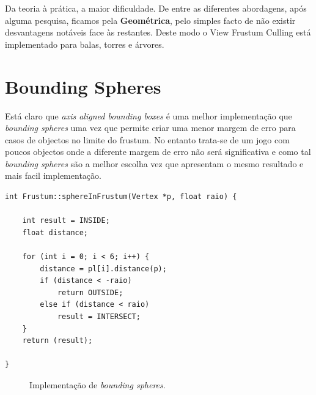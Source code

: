 Da teoria à prática, a maior dificuldade. De entre as diferentes abordagens, após alguma pesquisa, ficamos pela {\bf Geométrica}, pelo simples facto de não existir desvantagens notáveis face às restantes. Deste modo o View Frustum Culling está implementado para balas, torres e árvores.

\section{Bounding Spheres}
Está claro que \textit{axis aligned bounding boxes} é uma melhor implementação que \textit{bounding spheres} uma vez que permite criar uma menor margem de erro para casos de objectos no limite do frustum. No entanto trata-se de um jogo com poucos objectos onde a diferente margem de erro não será significativa e como tal \textit{bounding spheres} são a melhor escolha vez que apresentam o mesmo resultado e mais facil implementação.


\begin{lstlisting}[caption=Método para teste com \textit{bounding spheres}.]
int Frustum::sphereInFrustum(Vertex *p, float raio) {

    int result = INSIDE;
    float distance;

    for (int i = 0; i < 6; i++) {
        distance = pl[i].distance(p);
        if (distance < -raio)
            return OUTSIDE;
        else if (distance < raio)
            result = INTERSECT;
    }
    return (result);

}
\end{lstlisting}

\begin{figure}[here]
                 \caption{Implementação de \textit{bounding spheres}.}
                 \label{fig:prototype}
\end{figure}